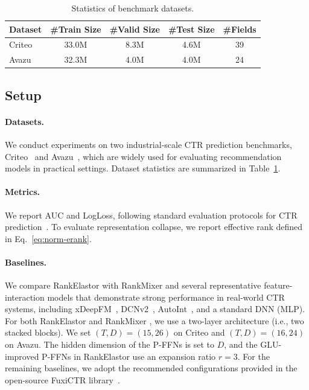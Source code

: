 \documentclass[sigconf,screen]{acmart}
\newcommand{\unimixer}{RankElastor }
\newcommand{\rankmixer}{RankMixer }
\begin{document}

\begin{table}[t]
    \centering
    \caption{Statistics of benchmark datasets.}
    \begin{tabular}{lcccc}
        \toprule
        Dataset & \#Train Size & \#Valid Size & \#Test Size & \#Fields \\
        \midrule
        Criteo   & 33.0M & 8.3M & 4.6M & 39 \\
        Avazu  & 32.3M & 4.0M & 4.0M & 24 \\
        \bottomrule
    \end{tabular}
    \label{tab:stat}
\end{table}


\subsection{Setup}\label{sec:exps:setup}
\paragraph{Datasets.} We conduct experiments on two industrial-scale CTR prediction benchmarks, Criteo~\cite{criteo} and Avazu~\cite{avazu}, which are widely used for evaluating recommendation models in practical settings. 
Dataset statistics are summarized in Table~\ref{tab:stat}.

\paragraph{Metrics.} We report AUC and LogLoss, following standard evaluation protocols for CTR prediction~\cite{embedding-collapse-1-multiembedding,feagen,dcnv2+crossnet,xdeepfm+cin,autoint}. 
To evaluate representation collapse, we report effective rank defined in Eq.~\ref{eq:norm-erank}.

\paragraph{Baselines.} We compare \unimixer with \rankmixer and several representative feature-interaction models that demonstrate strong performance in real-world CTR systems, including xDeepFM~\cite{xdeepfm+cin}, DCNv2~\cite{dcnv2+crossnet}, AutoInt~\cite{autoint}, and a standard DNN (MLP). 
For both \unimixer and \rankmixer, we use a two-layer architecture (i.e., two stacked blocks). 
We set \((T, D) = (15, 26)\) on Criteo and \((T, D) = (16, 24)\) on Avazu. 
The hidden dimension of the P-FFNs is set to \(D\), and the GLU-improved P-FFNs in \unimixer use an expansion ratio \(r = 3\). 
For the remaining baselines, we adopt the recommended configurations provided in the open-source FuxiCTR library~\cite{benchmark-fuxictr}.
\end{document}
